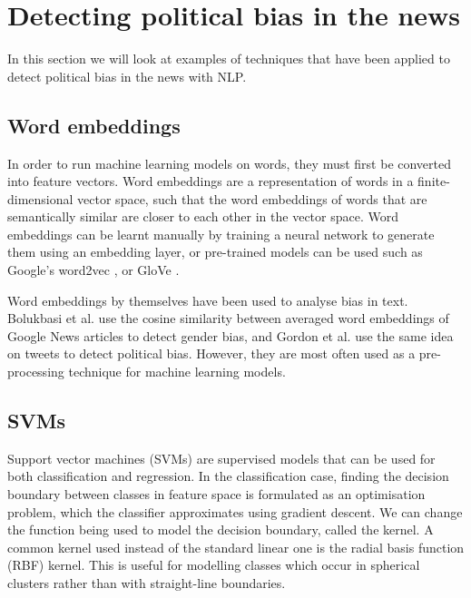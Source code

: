\section{Detecting political bias in the news} \label{sec:detecting-political-bias-in-news}

In this section we will look at examples of techniques that have been applied to detect political bias in the news with NLP.

\subsection{Word embeddings} \label{subsec:word-embeddings}

In order to run machine learning models on words, they must first be converted into feature vectors. Word embeddings are a representation of words in a finite-dimensional vector space, such that the word embeddings of words that are semantically similar are closer to each other in the vector space. Word embeddings can be learnt manually by training a neural network to generate them using an embedding layer, or pre-trained models can be used such as Google's word2vec \cite{word2vec}, or GloVe \cite{glove}.

Word embeddings by themselves have been used to analyse bias in text. Bolukbasi et al. \cite{gender-bias-word-embeddings} use the cosine similarity between averaged word embeddings of Google News articles to detect gender bias, and Gordon et al. \cite{political-bias-word-embeddings} use the same idea on tweets to detect political bias. However, they are most often used as a pre-processing technique for machine learning models.

\subsection{SVMs} \label{subsec:svms}

Support vector machines (SVMs) are supervised models that can be used for both classification and regression. In the classification case, finding the decision boundary between classes in feature space is formulated as an optimisation problem, which the classifier approximates using gradient descent. We can change the function being used to model the decision boundary, called the kernel. A common kernel used instead of the standard linear one is the radial basis function (RBF) kernel. This is useful for modelling classes which occur in spherical clusters rather than with straight-line boundaries.

